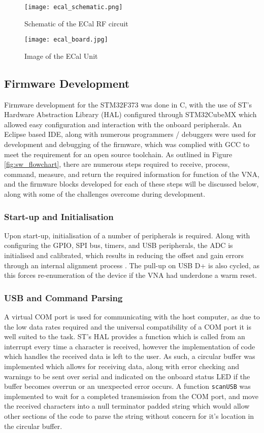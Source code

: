 \begin{figure}[H]
	\centering
	\texttt{[image: ecal\_schematic.png]}
	\caption{Schematic of the ECal RF circuit}
	\label{fig:ecal_schematic}
\end{figure}

\begin{figure}[H]
	\centering
	\texttt{[image: ecal\_board.jpg]}
	\caption{Image of the ECal Unit}
	\label{fig:ecal_photo}
\end{figure}

\subsection{Firmware Development}
Firmware development for the STM32F373 was done in C, with the use of ST's Hardware Abstraction Library (HAL) configured through STM32CubeMX which allowed easy configuration and interaction with the onboard peripherals. An Eclipse based IDE, along with numerous programmers / debuggers were used for development and debugging of the firmware, which was complied with GCC to meet the requirement for an open source toolchain. As outlined in Figure \ref{fig:sw_flowchart}, there are numerous steps required to receive, process, command, measure, and return the required information for function of the VNA, and the firmware blocks developed for each of these steps will be discussed below, along with some of the challenges overcome during development. 

\subsubsection{Start-up and Initialisation}
Upon start-up, initialisation of a number of peripherals is required. Along with configuring the GPIO, SPI bus, timers, and USB peripherals, the ADC is initialised and calibrated, which results in reducing the offset and gain errors through an internal alignment process \cite{st_sdadc}. The pull-up on USB D+ is also cycled, as this forces re-enumeration of the device if the VNA had underdone a warm reset. 

\subsubsection{USB and Command Parsing}
A virtual COM port is used for communicating with the host computer, as due to the low data rates required and the universal compatibility of a COM port it is well suited to the task. ST's HAL provides a function which is called from an interrupt every time a character is received, however the implementation of code which handles the received data is left to the user. As such, a circular buffer was implemented which allows for receiving data, along with error checking and warnings to be sent over serial and indicated on the onboard status LED if the buffer becomes overrun or an unexpected error occurs. A function \texttt{scanUSB} was implemented to wait for a completed transmission from the COM port, and move the received characters into a null terminator padded string which would allow other sections of the code to parse the string without concern for it's location in the circular buffer. 

